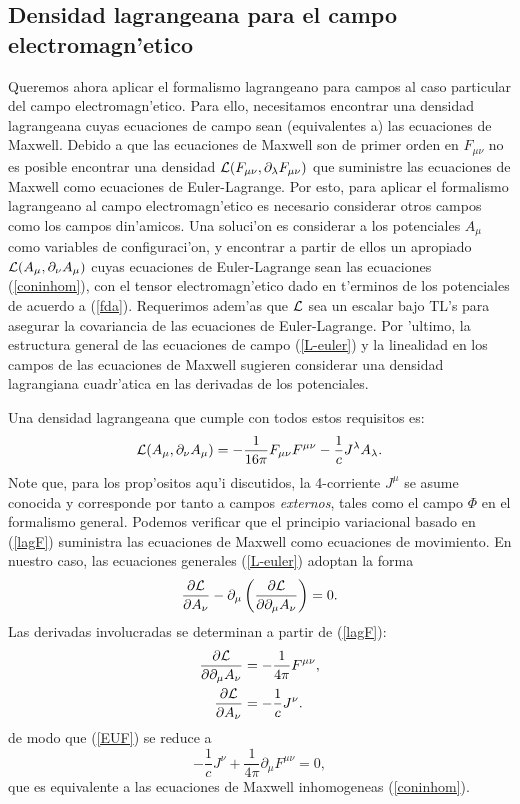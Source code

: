 \subsection{Densidad lagrangeana para el campo electromagn'etico}
Queremos ahora aplicar el formalismo lagrangeano para campos al caso particular
del campo electromagn'etico. Para ello, necesitamos encontrar una densidad
lagrangeana cuyas ecuaciones de campo sean (equivalentes a) las ecuaciones de
Maxwell. Debido a que las ecuaciones de Maxwell son de primer orden en
$F_{\mu\nu}$ no es posible encontrar una densidad ${\cal
L}(F_{\mu\nu},\partial_\lambda F_{\mu\nu})$ que suministre las ecuaciones de
Maxwell como ecuaciones de Euler-Lagrange. Por esto, para aplicar el formalismo
lagrangeano al campo electromagn'etico es necesario considerar otros campos como
los campos din'amicos. Una soluci'on es considerar a los potenciales $A_\mu$
como variables de configuraci'on, y encontrar a partir de ellos un apropiado
${\cal L}(A_\mu,\partial_\nu A_\mu)$ cuyas ecuaciones de Euler-Lagrange sean las
ecuaciones (\ref{coninhom}), con el tensor electromagn'etico dado en
t'erminos de los potenciales de acuerdo a (\ref{fda}). Requerimos
adem'as que $\cal L$ sea un escalar bajo TL's para asegurar la
covariancia de las ecuaciones de Euler-Lagrange. Por 'ultimo, la estructura
general de las ecuaciones de campo (\ref{L-euler}) y la linealidad en los campos
de las ecuaciones de Maxwell sugieren considerar una densidad lagrangiana
cuadr'atica en las derivadas de los potenciales.

Una densidad lagrangeana que cumple con todos estos requisitos es:
\begin{equation}
{\cal L}(A_\mu,\partial_\nu A_\mu) =-\frac{1}{16\pi}F_{\mu\nu}F^{\mu\nu}-\frac{1}{c}J^{\lambda
}A_{\lambda} .\label{lagF}
\end{equation}
Note que, para los prop'ositos aqu'i discutidos, la 4-corriente $J^\mu$ se asume
conocida y corresponde por tanto a campos \textit{externos}, tales como el campo
$\Phi$ en el formalismo general. Podemos verificar que el principio variacional
basado en (\ref{lagF}) suministra las ecuaciones de Maxwell como ecuaciones de
movimiento. En nuestro caso, las ecuaciones generales (\ref{L-euler}) adoptan la
forma
\begin{equation}
\frac{\partial{\cal L}}{\partial A_{\nu}}-\partial_\mu\left(  \frac
{\partial{\cal L}}{\partial\partial_\mu A_{\nu}}\right) =0. \label{EUF}
\end{equation}
Las derivadas involucradas se determinan a partir de (\ref{lagF}):
\begin{align}
\frac{\partial{\cal L}}{\partial\partial_\mu A_{\nu}}  & =-\frac{1}{4\pi
}F^{\mu\nu}, \label{dLdda}\\
\frac{\partial{\cal L}}{\partial A_{\nu}}  & =-\frac{1}{c}J^\nu .
\end{align}
de modo que (\ref{EUF}) se reduce a
\begin{equation}
-\frac{1}{c}J^\nu +\frac{1}{4\pi}\partial_\mu F^{\mu\nu}=0,
\end{equation}
que es equivalente a las ecuaciones de Maxwell inhomogeneas (\ref{coninhom}).

